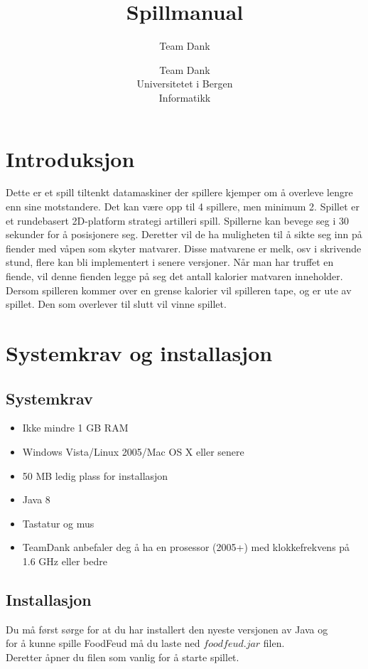 \documentclass[paper=a4]{article}
\title{Spillmanual}
\author{Team Dank}
\begin{document}
\author{Team Dank \\
Universitetet i Bergen \\
Informatikk}
\maketitle

\newpage

\section{Introduksjon}
Dette er et spill tiltenkt datamaskiner der spillere kjemper om å overleve lengre enn sine motstandere. Det kan være opp til 4 spillere, men minimum 2. Spillet er et rundebasert 2D-platform strategi artilleri spill. Spillerne kan bevege seg i 30 sekunder for å posisjonere seg. Deretter vil de ha muligheten til å sikte seg inn på fiender med våpen som skyter matvarer. Disse matvarene er melk, osv i skrivende stund, flere kan bli implementert i senere versjoner. %
Når man har truffet en fiende, vil denne fienden legge på seg det antall kalorier matvaren inneholder. Dersom spilleren kommer over en grense kalorier vil spilleren tape, og er ute av spillet. Den som overlever til slutt vil vinne spillet.


\section{Systemkrav og installasjon}

\subsection{Systemkrav}
\begin{itemize}
	\item{Ikke mindre 1 GB RAM}
	\item{Windows Vista/Linux 2005/Mac OS X eller senere}
	\item{50 MB ledig plass for installasjon}
	\item{Java 8}
	\item{Tastatur og mus}
	\item{TeamDank anbefaler deg å ha en prosessor (2005+) med klokkefrekvens på 1.6 GHz eller bedre}
\end{itemize}

\subsection{Installasjon}
Du må først sørge for at du har installert den nyeste versjonen av Java og \\
for å kunne spille FoodFeud må du laste ned $foodfeud.jar$ filen. \\
Deretter åpner du filen som vanlig for å starte spillet.  
\newpage
\end{document}
